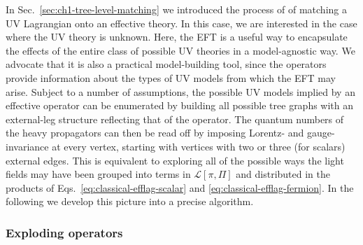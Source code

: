 In Sec.~\ref{sec:ch1-tree-level-matching} we introduced the process of of
matching a UV Lagrangian onto an effective theory. In this case, we are
interested in the case where the UV theory is unknown. Here, the EFT is a useful
way to encapsulate the effects of the entire class of possible UV theories in a
model-agnostic way. We advocate that it is also a practical model-building tool,
since the operators provide information about the types of UV models from which
the EFT may arise. Subject to a number of assumptions, the possible UV models
implied by an effective operator can be enumerated by building all possible tree
graphs with an external-leg structure reflecting that of the operator. The
quantum numbers of the heavy propagators can then be read off by imposing
Lorentz- and gauge-invariance at every vertex, starting with vertices with two
or three (for scalars) external edges. This is equivalent to exploring all of
the possible ways the light fields may have been grouped into terms in
$\mathscr{L}[\pi, \Pi]$ and distributed in the products of
Eqs.~\eqref{eq:classical-efflag-scalar} and \eqref{eq:classical-efflag-fermion}.
In the following we develop this picture into a precise algorithm.

\subsubsection{Exploding operators}
\label{sec:exploding-operators}


